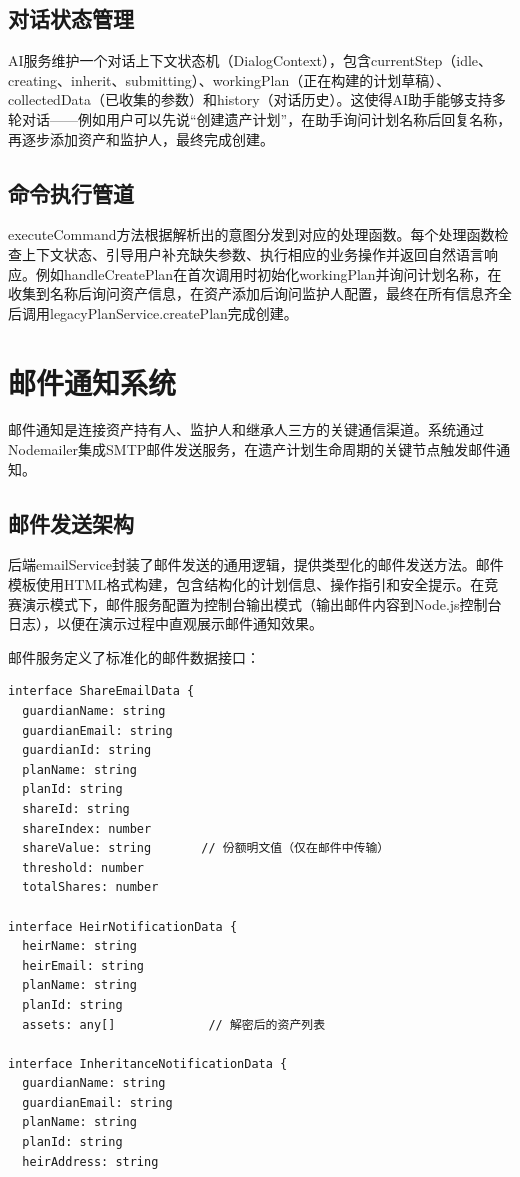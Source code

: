\documentclass[UTF8,a4paper,zihao=-4,openany]{ctexrep}
\begin{document}
\subsection{对话状态管理}

AI服务维护一个对话上下文状态机（DialogContext），包含currentStep（idle、creating、inherit、submitting）、workingPlan（正在构建的计划草稿）、collectedData（已收集的参数）和history（对话历史）。这使得AI助手能够支持多轮对话——例如用户可以先说“创建遗产计划”，在助手询问计划名称后回复名称，再逐步添加资产和监护人，最终完成创建。

\subsection{命令执行管道}

executeCommand方法根据解析出的意图分发到对应的处理函数。每个处理函数检查上下文状态、引导用户补充缺失参数、执行相应的业务操作并返回自然语言响应。例如handleCreatePlan在首次调用时初始化workingPlan并询问计划名称，在收集到名称后询问资产信息，在资产添加后询问监护人配置，最终在所有信息齐全后调用legacyPlanService.createPlan完成创建。

\section{邮件通知系统}

邮件通知是连接资产持有人、监护人和继承人三方的关键通信渠道。系统通过Nodemailer集成SMTP邮件发送服务，在遗产计划生命周期的关键节点触发邮件通知。

\subsection{邮件发送架构}

后端emailService封装了邮件发送的通用逻辑，提供类型化的邮件发送方法。邮件模板使用HTML格式构建，包含结构化的计划信息、操作指引和安全提示。在竞赛演示模式下，邮件服务配置为控制台输出模式（输出邮件内容到Node.js控制台日志），以便在演示过程中直观展示邮件通知效果。

邮件服务定义了标准化的邮件数据接口：

\begin{lstlisting}[caption={邮件数据接口定义 (emailService.ts, 接口节选)}]
interface ShareEmailData {
  guardianName: string
  guardianEmail: string
  guardianId: string
  planName: string
  planId: string
  shareId: string
  shareIndex: number
  shareValue: string       // 份额明文值（仅在邮件中传输）
  threshold: number
  totalShares: number

interface HeirNotificationData {
  heirName: string
  heirEmail: string
  planName: string
  planId: string
  assets: any[]             // 解密后的资产列表

interface InheritanceNotificationData {
  guardianName: string
  guardianEmail: string
  planName: string
  planId: string
  heirAddress: string
\end{lstlisting}
\end{document}
